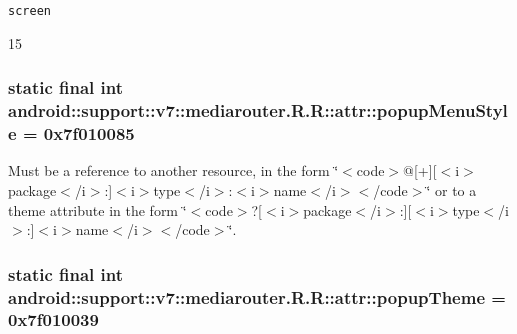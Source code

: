 {\tt screen}

15\hypertarget{classandroid_1_1support_1_1v7_1_1mediarouter_1_1_r_1_1attr_d957ab3fce4442200fc81eb2946cb89a}{
\subsubsection[{popupMenuStyle}]{\setlength{\rightskip}{0pt plus 5cm}static final int android::support::v7::mediarouter.R.R::attr::popupMenuStyle = 0x7f010085}}
\label{classandroid_1_1support_1_1v7_1_1mediarouter_1_1_r_1_1attr_d957ab3fce4442200fc81eb2946cb89a}


Must be a reference to another resource, in the form \char`\"{}$<$code$>$@\mbox{[}+\mbox{]}\mbox{[}$<$i$>$package$<$/i$>$:\mbox{]}$<$i$>$type$<$/i$>$:$<$i$>$name$<$/i$>$$<$/code$>$\char`\"{} or to a theme attribute in the form \char`\"{}$<$code$>$?\mbox{[}$<$i$>$package$<$/i$>$:\mbox{]}\mbox{[}$<$i$>$type$<$/i$>$:\mbox{]}$<$i$>$name$<$/i$>$$<$/code$>$\char`\"{}. \hypertarget{classandroid_1_1support_1_1v7_1_1mediarouter_1_1_r_1_1attr_c3f7a2dec112d38bbeb840edd1db2d1c}{
\subsubsection[{popupTheme}]{\setlength{\rightskip}{0pt plus 5cm}static final int android::support::v7::mediarouter.R.R::attr::popupTheme = 0x7f010039}}
\label{classandroid_1_1support_1_1v7_1_1mediarouter_1_1_r_1_1attr_c3f7a2dec112d38bbeb840edd1db2d1c}


